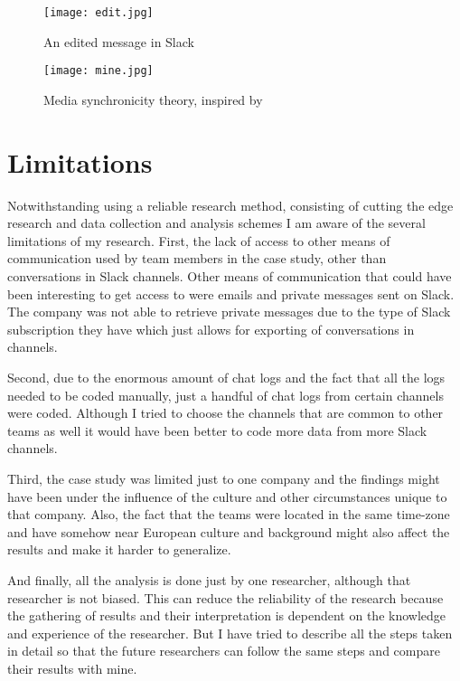 \begin{figure}[!t]
\centering
\texttt{[image: edit.jpg]}
\caption{An edited message in Slack}\label{fig:edit}
\end{figure}

\begin{figure}[hbt!]
\centering
\texttt{[image: mine.jpg]}
\caption{Media synchronicity theory, inspired by \citet{Maruping2004}}\label{fig:mine}
\end{figure}


\chapter{Limitations}

Notwithstanding using a reliable research method, consisting of cutting the edge research and data collection and analysis schemes I am aware of the several limitations of my research. First, the lack of access to other means of communication used by team members in the case study, other than conversations in Slack channels. Other means of communication that could have been interesting to get access to were emails and private messages sent on Slack. The company was not able to retrieve private messages due to the type of Slack subscription they have which just allows for exporting of conversations in channels.

Second, due to the enormous amount of chat logs and the fact that all the logs needed to be coded manually, just a handful of chat logs from certain channels were coded. Although I tried to choose the channels that are common to other teams as well it would have been better to code more data from more Slack channels.

Third, the case study was limited just to one company and the findings might have been under the influence of the culture and other circumstances unique to that company. Also, the fact that the teams were located in the same time-zone and have somehow near European culture and background might also affect the results and make it harder to generalize.

And finally,  all the analysis is done just by one researcher, although that researcher is not biased. This can reduce the reliability of the research because the gathering of results and their interpretation is dependent on the knowledge and experience of the researcher. But I have tried to describe all the steps taken in detail so that the future researchers can follow the same steps and compare their results with mine.

